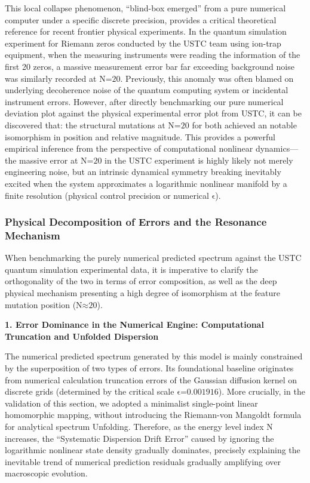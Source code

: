 This local collapse phenomenon, ``blind-box emerged'' from a pure
numerical computer under a specific discrete precision, provides a
critical theoretical reference for recent frontier physical experiments.
In the quantum simulation experiment for Riemann zeros conducted by the
USTC team using ion-trap equipment, when the measuring instruments were
reading the information of the first 20 zeros, a massive measurement
error bar far exceeding background noise was similarly recorded at
\(\text{N}\text{=20}\). Previously, this anomaly was often blamed on
underlying decoherence noise of the quantum computing system or
incidental instrument errors. However, after directly benchmarking our
pure numerical deviation plot against the physical experimental error
plot from USTC, it can be discovered that: the structural mutations at
\(\text{N}\text{=20}\) for both achieved an notable isomorphism in
position and relative magnitude. This provides a powerful empirical
inference from the perspective of computational nonlinear dynamics---the
massive error at \(\text{N}\text{=20}\) in the USTC experiment is highly
likely not merely engineering noise, but an intrinsic dynamical symmetry
breaking inevitably excited when the system approximates a logarithmic
nonlinear manifold by a finite resolution (physical control precision or
numerical \(\text{ϵ}\)).

\subsubsection*{Physical Decomposition of Errors and the Resonance Mechanism}

When benchmarking the purely numerical predicted spectrum against the
USTC quantum simulation experimental data, it is imperative to clarify
the orthogonality of the two in terms of error composition, as well as
the deep physical mechanism presenting a high degree of isomorphism at
the feature mutation position (\(\text{N}\text{≈20}\)).

\textbf{1. Error Dominance in the Numerical Engine: Computational
Truncation and Unfolded Dispersion}

The numerical predicted spectrum generated by this model is mainly
constrained by the superposition of two types of errors. Its
foundational baseline originates from numerical calculation truncation
errors of the Gaussian diffusion kernel on discrete grids (determined by
the critical scale \(\text{ϵ=0.001916}\)). More crucially, in the
validation of this section, we adopted a minimalist single-point linear
homomorphic mapping, without introducing the Riemann-von Mangoldt
formula for analytical spectrum Unfolding. Therefore, as the energy
level index \(\text{N}\) increases, the ``Systematic Dispersion Drift
Error'' caused by ignoring the logarithmic nonlinear state density
gradually dominates, precisely explaining the inevitable trend of
numerical prediction residuals gradually amplifying over macroscopic
evolution.

